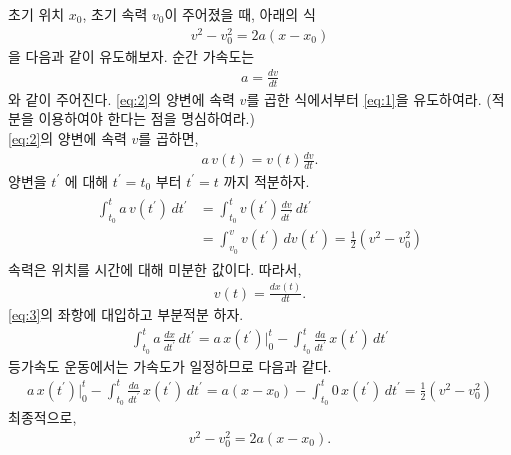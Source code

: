 \documentclass[floatfix,nofootinbib,superscriptaddress,fleqn,preprint]{revtex4}
\begin{document}
\vspace{2cm}

 초기 위치 $x_0$, 초기 속력 $v_0$이
주어졌을 때, 아래의 식
\begin{align}
  \label{eq:1}
v^2 - v_0^2 = 2a(x-x_0)  
\end{align}
을 다음과 같이 유도해보자. 순간 가속도는
\begin{align}
  \label{eq:2}
a = \frac{dv}{dt}
\end{align}
와 같이 주어진다. \eqref{eq:2}의 양변에 속력 $v$를 곱한 식에서부터
\eqref{eq:1}을 유도하여라. (적분을 이용하여야 한다는 점을 명심하여라.)  \\
 \eqref{eq:2}의 양변에 속력 $v$를 곱하면,
\begin{align}
  a\,v(t) = v(t)\frac{dv}{dt}.
\end{align}
양변을 $t^\prime$ 에 대해 $t^{\prime}=t_0$ 부터 $t^\prime=t$ 까지 적분하자.
\begin{align}\label{eq:3}
  \begin{split}
    \int_{t_0}^t a\,v(t^\prime)\,dt^\prime 
    &=\int_{t_0}^t v(t^\prime)\frac{dv}{dt^\prime}\,dt^\prime  \\
    &= \int_{v_0}^v v(t^\prime)\,dv(t^\prime)
    =\frac{1}{2}\left(v^2-v^2_0\right)
  \end{split}
\end{align} 
속력은 위치를 시간에 대해 미분한 값이다. 따라서,
\begin{align}
  v(t)=\frac{dx(t)}{dt}.
\end{align}
\eqref{eq:3}의 좌항에 대입하고 부분적분 하자.
\begin{align}
  \int_{t_0}^ta\,\frac{dx}{dt^\prime}\,dt^\prime
  =a\,x(t^\prime)|_{0}^t-\int_{t_0}^t\frac{da}{dt^\prime}\,x(t^\prime) \,dt^\prime
\end{align}
등가속도 운동에서는 가속도가 일정하므로 다음과 같다.
\begin{align}
  a\,x(t^\prime)|_{0}^t-\int_{t_0}^t\frac{da}{dt^\prime}\,x(t^\prime) \,dt^\prime
  =a\left(x-x_0\right)-\int_{t_0}^t0\,x(t^\prime) \,dt^\prime
  =\frac{1}{2}\left(v^2-v^2_0\right)
\end{align}
최종적으로,
\begin{align}
  v^2 - v_0^2 = 2a(x-x_0).
\end{align}
\end{document}

